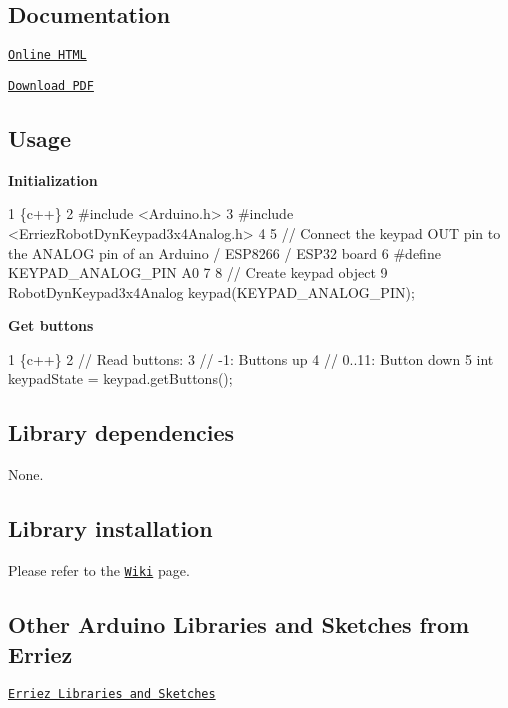\subsection*{Documentation}


\begin{DoxyItemize}
\item \href{https://Erriez.github.io/ErriezRobotDynKeypad3x4Analog}{\tt Online H\+T\+ML}
\item \href{https://github.com/Erriez/ErriezRobotDynKeypad3x4Analog/raw/gh-pages/latex/ErriezRobotDynKeypad3x4Analog.pdf}{\tt Download P\+DF}
\end{DoxyItemize}

\subsection*{Usage}

{\bfseries Initialization}


\begin{DoxyCode}
1 \{c++\}
2 #include <Arduino.h>
3 #include <ErriezRobotDynKeypad3x4Analog.h>
4 
5 // Connect the keypad OUT pin to the ANALOG pin of an Arduino / ESP8266 / ESP32 board
6 #define KEYPAD\_ANALOG\_PIN   A0
7 
8 // Create keypad object
9 RobotDynKeypad3x4Analog keypad(KEYPAD\_ANALOG\_PIN);
\end{DoxyCode}


{\bfseries Get buttons}


\begin{DoxyCode}
1 \{c++\}
2 // Read buttons:
3 // -1:    Buttons up
4 // 0..11: Button down
5 int keypadState = keypad.getButtons();
\end{DoxyCode}


\subsection*{Library dependencies}


\begin{DoxyItemize}
\item None.
\end{DoxyItemize}

\subsection*{Library installation}

Please refer to the \href{https://github.com/Erriez/ErriezArduinoLibrariesAndSketches/wiki}{\tt Wiki} page.

\subsection*{Other Arduino Libraries and Sketches from Erriez}


\begin{DoxyItemize}
\item \href{https://github.com/Erriez/ErriezArduinoLibrariesAndSketches}{\tt Erriez Libraries and Sketches} 
\end{DoxyItemize}